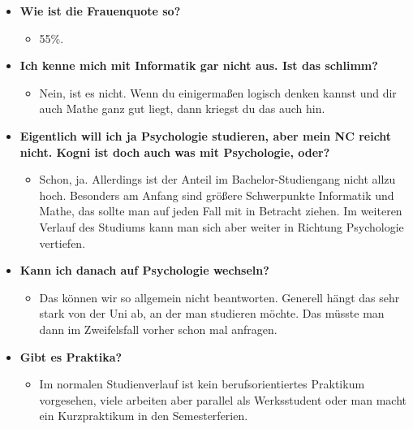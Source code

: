 \begin{large}
\begin{itemize}
	\item \textbf{Wie ist die Frauenquote so?}
	\begin{itemize}
		\item 55\%.
	\end{itemize}
\end{itemize}

\begin{itemize}
	\item \textbf{Ich kenne mich mit Informatik gar nicht aus. Ist das schlimm?}
	\begin{itemize}
		\item Nein, ist es nicht. Wenn du einigermaßen logisch denken kannst und dir auch Mathe ganz gut liegt, dann kriegst du das auch hin.
	\end{itemize}
\end{itemize}

\begin{itemize}
	\item \textbf{Eigentlich will ich ja Psychologie studieren, aber mein NC reicht nicht. Kogni ist doch auch was mit Psychologie, oder?}
	\begin{itemize}
		\item Schon, ja. Allerdings ist der Anteil im Bachelor-Studiengang nicht allzu hoch. Besonders am Anfang sind größere Schwerpunkte Informatik und Mathe, das sollte man auf jeden Fall mit in Betracht ziehen. Im weiteren Verlauf des Studiums kann man sich aber weiter in Richtung Psychologie vertiefen.
	\end{itemize}
\end{itemize}

\begin{itemize}
	\item \textbf{Kann ich danach auf Psychologie wechseln?}
	\begin{itemize}
		\item Das können wir so allgemein nicht beantworten. Generell hängt das sehr stark von der Uni ab, an der man studieren möchte. Das müsste man dann im Zweifelsfall vorher schon mal anfragen.
	\end{itemize}
\end{itemize}

\begin{itemize}
	\item \textbf{Gibt es Praktika?}
	\begin{itemize}
		\item Im normalen Studienverlauf ist kein berufsorientiertes Praktikum vorgesehen, viele arbeiten aber parallel als Werksstudent oder man macht ein Kurzpraktikum in den Semesterferien.
	\end{itemize}
\end{itemize}


\end{large}
